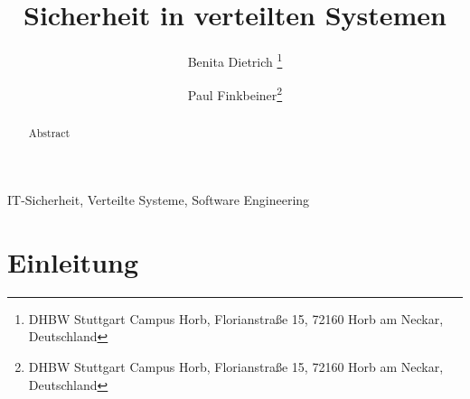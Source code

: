 \documentclass[utf8,biblatex]{lni}
\begin{document}
\title[Sicherheit in verteilten Systemen]{Sicherheit in verteilten Systemen}
\author[Benita Dietrich \and Paul Finkbeiner]
{Benita Dietrich \footnote{DHBW Stuttgart Campus Horb, Florianstraße 15, 72160 Horb am Neckar, Deutschland} \and
 Paul Finkbeiner\footnote{DHBW Stuttgart Campus Horb, Florianstraße 15, 72160 Horb am Neckar, Deutschland}}
\maketitle

\begin{abstract}
Abstract
\end{abstract}

\begin{keywords}
IT-Sicherheit, Verteilte Systeme, Software Engineering
\end{keywords}

\section{Einleitung}\label{Einleitung}
\end{document}
